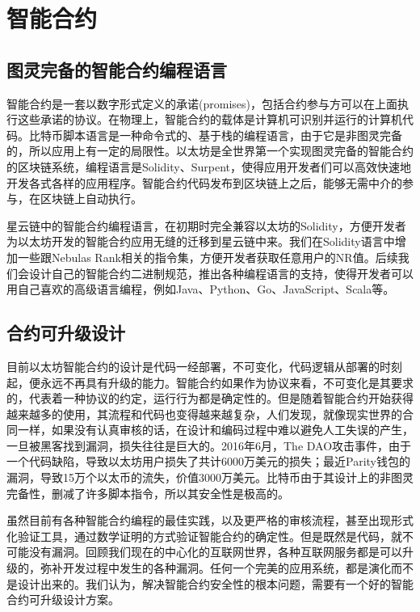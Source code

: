 \section{智能合约}
\label{sec:smartcontract}

\subsection{图灵完备的智能合约编程语言}
智能合约是一套以数字形式定义的承诺(promises)，包括合约参与方可以在上面执行这些承诺的协议。在物理上，智能合约的载体是计算机可识别并运行的计算机代码。比特币脚本语言是一种命令式的、基于栈的编程语言，由于它是非图灵完备的，所以应用上有一定的局限性。以太坊是全世界第一个实现图灵完备的智能合约的区块链系统，编程语言是Solidity、Surpent，使得应用开发者们可以高效快速地开发各式各样的应用程序。智能合约代码发布到区块链上之后，能够无需中介的参与，在区块链上自动执行。

星云链中的智能合约编程语言，在初期时完全兼容以太坊的Solidity，方便开发者为以太坊开发的智能合约应用无缝的迁移到星云链中来。我们在Solidity语言中增加一些跟Nebulas Rank相关的指令集，方便开发者获取任意用户的NR值。后续我们会设计自己的智能合约二进制规范，推出各种编程语言的支持，使得开发者可以用自己喜欢的高级语言编程，例如Java、Python、Go、JavaScript、Scala等。

\subsection{合约可升级设计}
目前以太坊智能合约的设计是代码一经部署，不可变化，代码逻辑从部署的时刻起，便永远不再具有升级的能力。智能合约如果作为协议来看，不可变化是其要求的，代表着一种协议的约定，运行行为都是确定性的。但是随着智能合约开始获得越来越多的使用，其流程和代码也变得越来越复杂，人们发现，就像现实世界的合同一样，如果没有认真审核的话，在设计和编码过程中难以避免人工失误的产生，一旦被黑客找到漏洞，损失往往是巨大的。2016年6月，The DAO攻击事件，由于一个代码缺陷，导致以太坊用户损失了共计6000万美元的损失；最近Parity钱包的漏洞，导致15万个以太币的流失，价值3000万美元。比特币由于其设计上的非图灵完备性，删减了许多脚本指令，所以其安全性是极高的。

虽然目前有各种智能合约编程的最佳实践，以及更严格的审核流程，甚至出现形式化验证工具，通过数学证明的方式验证智能合约的确定性。但是既然是代码，就不可能没有漏洞。回顾我们现在的中心化的互联网世界，各种互联网服务都是可以升级的，弥补开发过程中发生的各种漏洞。任何一个完美的应用系统，都是演化而不是设计出来的。我们认为，解决智能合约安全性的根本问题，需要有一个好的智能合约可升级设计方案。

